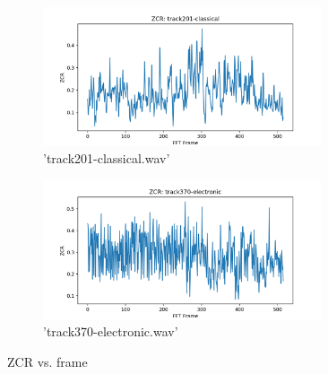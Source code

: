 \documentclass[11pt,a4paper]{article}
\begin{document}
\begin{figure}[tb]
	\centering
	\begin{subfigure}[t]{\hsize}
		\centering
		\includegraphics[width=0.9\textwidth]{zcr_track201-classical}
		\caption{'track201-classical.wav'}
		\label{fig:zcr_classical}
	\end{subfigure}
	\begin{subfigure}[t]{\hsize}
		\centering
		\includegraphics[width=0.9\textwidth]{zcr_track370-electronic}
		\caption{'track370-electronic.wav'}
		\label{fig:zcr_electronic}
	\end{subfigure}
	\caption{ZCR vs. frame \label{fig:zcr}}
\end{figure}
\clearpage
\end{document}
